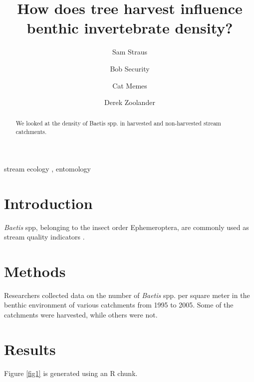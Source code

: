 \documentclass[preprint, 3p,
authoryear]{elsarticle} %
\begin{document}
\begin{frontmatter}

  \title{How does tree harvest influence benthic invertebrate density?}
    \author[McGill University]{Sam Straus%
  }
    \author[Another University]{Bob Security}
    \author[Another University]{Cat Memes%
  }
    \author[Some Institute of Technology]{Derek Zoolander%
  }
  
  \begin{abstract}
  We looked at the density of Baetis spp. in harvested and non-harvested
  stream catchments.
  \end{abstract}
    \begin{keyword}
    stream ecology \sep 
    entomology
  \end{keyword}
  
 \end{frontmatter}

\hypertarget{introduction}{%
\section{Introduction}\label{introduction}}

\emph{Baetis} spp, belonging to the insect order Ephemeroptera, are
commonly used as stream quality indicators \citet{wallace1986response}.

\hypertarget{methods}{%
\section{Methods}\label{methods}}

Researchers collected data on the number of \emph{Baetis} spp. per
square meter in the benthic environment of various catchments from 1995
to 2005. Some of the catchments were harvested, while others were not.

\hypertarget{results}{%
\section{Results}\label{results}}

Figure \ref{fig1} is generated using an R chunk.
\end{document}
